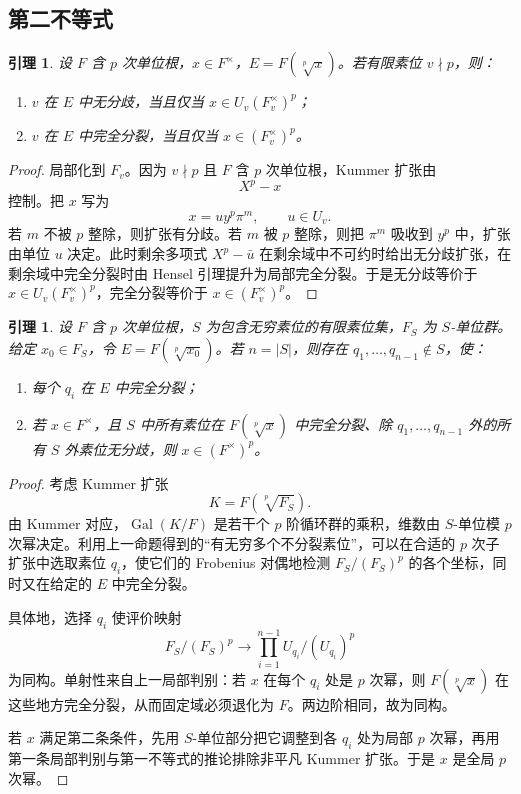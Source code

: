 \documentclass[11pt,a4paper,openany]{ctexbook}
\numberwithin{equation}{chapter}
\newcommand{\Gal}{\operatorname{Gal}}
\theoremstyle{plain}
\newtheorem{lemma}[theorem]{引理}
\theoremstyle{definition}
\theoremstyle{remark}
\begin{document}
\subsection{第二不等式}

\begin{lemma}
设 $F$ 含 $p$ 次单位根，$x\in F^\times$，$E=F(\sqrt[p]{x})$。若有限素位 $v\nmid p$，则：
\begin{enumerate}
\item $v$ 在 $E$ 中无分歧，当且仅当 $x\in U_v(F_v^\times)^p$；
\item $v$ 在 $E$ 中完全分裂，当且仅当 $x\in(F_v^\times)^p$。
\end{enumerate}
\end{lemma}

\begin{proof}
局部化到 $F_v$。因为 $v\nmid p$ 且 $F$ 含 $p$ 次单位根，Kummer 扩张由
\[
X^p-x
\]
控制。把 $x$ 写为
\[
x=u y^p\pi^m,\qquad u\in U_v.
\]
若 $m$ 不被 $p$ 整除，则扩张有分歧。若 $m$ 被 $p$ 整除，则把 $\pi^m$ 吸收到 $y^p$ 中，扩张由单位 $u$ 决定。此时剩余多项式 $X^p-\bar u$ 在剩余域中不可约时给出无分歧扩张，在剩余域中完全分裂时由 Hensel 引理提升为局部完全分裂。于是无分歧等价于 $x\in U_v(F_v^\times)^p$，完全分裂等价于 $x\in(F_v^\times)^p$。
\end{proof}

\begin{lemma}
设 $F$ 含 $p$ 次单位根，$S$ 为包含无穷素位的有限素位集，$F_S$ 为 $S$-单位群。给定 $x_0\in F_S$，令 $E=F(\sqrt[p]{x_0})$。若 $n=|S|$，则存在 $q_1,\dots,q_{n-1}\notin S$，使：
\begin{enumerate}
\item 每个 $q_i$ 在 $E$ 中完全分裂；
\item 若 $x\in F^\times$，且 $S$ 中所有素位在 $F(\sqrt[p]{x})$ 中完全分裂、除 $q_1,\dots,q_{n-1}$ 外的所有 $S$ 外素位无分歧，则 $x\in(F^\times)^p$。
\end{enumerate}
\end{lemma}

\begin{proof}
考虑 Kummer 扩张
\[
K=F(\sqrt[p]{F_S}).
\]
由 Kummer 对应，$\Gal(K/F)$ 是若干个 $p$ 阶循环群的乘积，维数由 $S$-单位模 $p$ 次幂决定。利用上一命题得到的“有无穷多个不分裂素位”，可以在合适的 $p$ 次子扩张中选取素位 $q_i$，使它们的 Frobenius 对偶地检测 $F_S/(F_S)^p$ 的各个坐标，同时又在给定的 $E$ 中完全分裂。

具体地，选择 $q_i$ 使评价映射
\[
F_S/(F_S)^p\longrightarrow\prod_{i=1}^{n-1}U_{q_i}/(U_{q_i})^p
\]
为同构。单射性来自上一局部判别：若 $x$ 在每个 $q_i$ 处是 $p$ 次幂，则 $F(\sqrt[p]{x})$ 在这些地方完全分裂，从而固定域必须退化为 $F$。两边阶相同，故为同构。

若 $x$ 满足第二条条件，先用 $S$-单位部分把它调整到各 $q_i$ 处为局部 $p$ 次幂，再用第一条局部判别与第一不等式的推论排除非平凡 Kummer 扩张。于是 $x$ 是全局 $p$ 次幂。
\end{proof}
\end{document}
